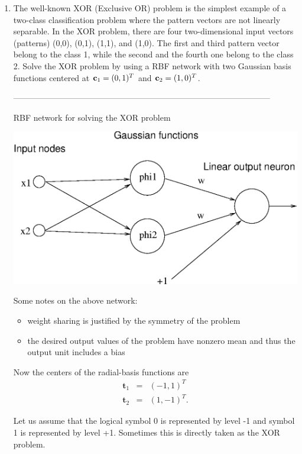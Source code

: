 \documentclass[10pt]{article}
\begin{document}
\begin{enumerate}
\vspace{2mm}

\vspace{2cm}
\item The well-known XOR (Exclusive OR) problem is the simplest example of a
  two-class classification problem where the pattern vectors are not linearly
  separable. In the XOR problem, there are four two-dimensional input vectors
  (patterns) (0,0), (0,1), (1,1), and (1,0). The first and third pattern
  vector belong to the class 1, while the second and the fourth one belong
  to the class 2. Solve the XOR problem by using a RBF network with two
  Gaussian basis functions centered at ${\bf c}_1 = (0,1)^T$ and
  ${\bf c}_2 = (1,0)^T$.

---------------------------------------------------------------------------------------------

RBF network for solving the XOR problem

\begin{center}
\includegraphics[scale=0.7]{v102-f1.eps}
\end{center}

Some notes on the above network:
\begin{itemize}
\item weight sharing is justified by the symmetry of the problem
\item the desired output values of the problem have nonzero mean and
thus the output unit includes a bias 
\end{itemize}
Now the centers of the radial-basis functions are
\begin{eqnarray*}
\mathbf{t}_1&=&(-1,1)^T\\
\mathbf{t}_2&=&(1,-1)^T.
\end{eqnarray*}

Let us assume that the logical symbol 0 is represented by level -1
and symbol 1 is represented by level +1. Sometimes this is directly
taken as the XOR problem.


\end{enumerate}
\end{document}
